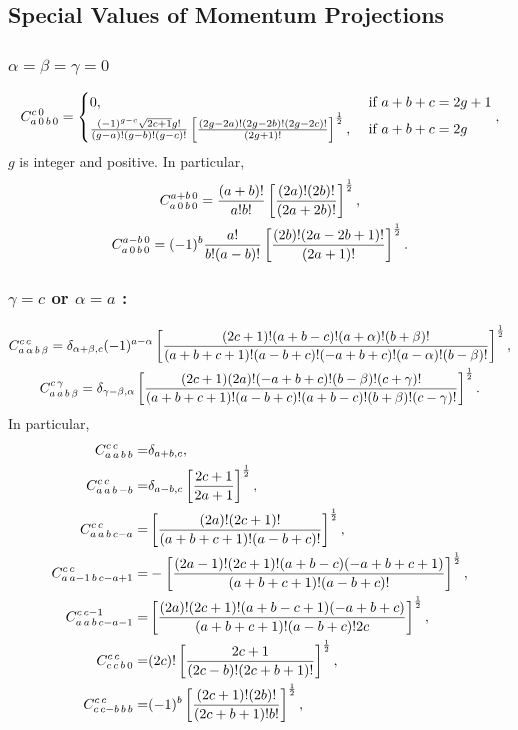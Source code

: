 \subsection{Special Values of Momentum Projections}\label{sec:8.5.2}
\subsubsection{$\alpha=\beta=\gamma=0$}
\begin{equation}
C_{a\,0\,b\,0}^{c\,0}= \begin{cases}0, & \text { if } a+b+c=2 g+1  \\ \frac{(-1)^{g-c} \sqrt{2 c+1} g!}{(g-a)!(g-b)!(g-c)!}\left[\frac{(2 g-2 a)!(2 g-2 b)!(2 g-2 c)!}{(2 g+1)!}\right]^{\frac{1}{2}}, & \text { if } a+b+c=2 g\end{cases}, \label{eq:8:5:32}
\end{equation}
$g$ is integer and positive. In particular,
\begin{gather}
C_{a\,0\,b\,0}^{a+b\,0}=\frac{(a+b)!}{a!b!}\left[\frac{(2 a)!(2 b)!}{(2 a+2 b)!}\right]^{\frac{1}{2}}, \label{eq:8:5:33}\\
C_{a\,0\,b\,0}^{a-b\,0}=(-1)^{b} \frac{a!}{b!(a-b)!}\left[\frac{(2 b)!(2 a-2 b+1)!}{(2 a+1)!}\right]^{\frac{1}{2}}. \label{eq:8:5:34}
\end{gather}
\subsubsection{ $\gamma=c$ or $\alpha=a$ :}
\begin{gather}
C_{a\,\alpha\,b\,\beta}^{c\,c}=\delta_{\alpha+\beta, c}(-1)^{a-\alpha}\left[\frac{(2 c+1)!(a+b-c)!(a+\alpha)!(b+\beta)!}{(a+b+c+1)!(a-b+c)!(-a+b+c)!(a-\alpha)!(b-\beta)!}\right]^{\frac{1}{2}}, \label{eq:8:5:35}\\
C_{a\,a\,b\,\beta}^{c\,\gamma}=\delta_{\gamma-\beta, \alpha}\left[\frac{(2 c+1)(2 a)!(-a+b+c)!(b-\beta)!(c+\gamma)!}{(a+b+c+1)!(a-b+c)!(a+b-c)!(b+\beta)!(c-\gamma)!}\right]^{\frac{1}{2}}. \label{eq:8:5:36}
\end{gather}
In particular,
\begin{align}
C_{a\,a\,b\,b}^{c\,c}=&\delta_{a+b, c}, \label{eq:8:5:37}\\
C_{a\,a\,b\,-b}^{c\,c}=&\delta_{a-b, c}\left[\frac{2 c+1}{2 a+1}\right]^{\frac{1}{2}}, \label{eq:8:5:38}\\
C_{a\,a\,b\,c-a}^{c\,c}=&\left[\frac{(2 a)!(2 c+1)!}{(a+b+c+1)!(a-b+c)!}\right]^{\frac{1}{2}}, \label{eq:8:5:39}\\
C_{a\,a-1\,b\,c-a+1}^{c\,c}=&-\left[\frac{(2 a-1)!(2 c+1)!(a+b-c)(-a+b+c+1)}{(a+b+c+1)!(a-b+c)!}\right]^{\frac{1}{2}}, \label{eq:8:5:40}\\
C_{a\,a\,b\,c-a-1}^{c\,c-1}=&\left[\frac{(2 a)!(2 c+1)!(a+b-c+1)(-a+b+c)}{(a+b+c+1)!(a-b+c)!2 c}\right]^{\frac{1}{2}}, \label{eq:8:5:41}\\
C_{c\,c\,b\,0}^{c\,c}=&(2 c)!\left[\frac{2 c+1}{(2 c-b)!(2 c+b+1)!}\right]^{\frac{1}{2}}, \label{eq:8:5:42}\\
C_{c\,c-b\,b\,b}^{c\,c}=&(-1)^{b}\left[\frac{(2 c+1)!(2 b)!}{(2 c+b+1)!b!}\right]^{\frac{1}{2}}, \label{eq:8:5:43}
\end{align}
